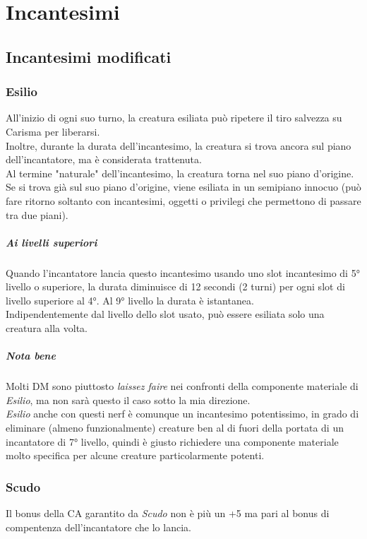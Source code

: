 \chapter{Incantesimi}

\section{Incantesimi modificati}

\subsection{Esilio}
All'inizio di ogni suo turno, la creatura esiliata può ripetere il tiro salvezza su Carisma per liberarsi. \\ Inoltre, durante la durata dell'incantesimo, la creatura si trova ancora sul piano dell'incantatore, ma è considerata trattenuta. \\ Al termine "naturale" dell'incantesimo, la creatura torna nel suo piano d'origine. Se si trova già sul suo piano d'origine, viene esiliata in un semipiano innocuo (può fare ritorno soltanto con incantesimi, oggetti o privilegi che permettono di passare tra due piani). 
\paragraph{Ai livelli superiori} Quando l'incantatore lancia questo incantesimo usando uno slot incantesimo di 5° livello o superiore, la durata diminuisce di 12 secondi (2 turni) per ogni slot di livello superiore al 4°. Al 9° livello la durata è istantanea. \\ Indipendentemente dal livello dello slot usato, può essere esiliata solo una creatura alla volta.
\paragraph{Nota bene} Molti DM sono piuttosto \textit{laissez faire} nei confronti della componente materiale di \textit{Esilio}, ma non sarà questo il caso sotto la mia direzione. \\ \textit{Esilio} anche con questi nerf è comunque un incantesimo potentissimo, in grado di eliminare (almeno funzionalmente) creature ben al di fuori della portata di un incantatore di 7° livello, quindi è giusto richiedere una componente materiale molto specifica per alcune creature particolarmente potenti.

\subsection{Scudo}
Il bonus della CA garantito da \textit{Scudo} non è più un +5 ma pari al bonus di compentenza dell'incantatore che lo lancia.

